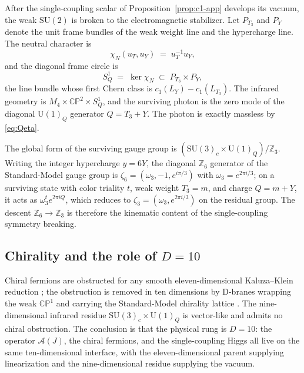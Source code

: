 \documentclass[aps,prd,onecolumn,superscriptaddress,nofootinbib,reprint]{revtex4-2}
\newcommand{\cA}{\mathcal{A}}
\newcommand{\SU}{\mathrm{SU}}
\newcommand{\U}{\mathrm{U}}
\newcommand{\CP}{\mathbb{CP}}
\newcommand{\Z}{\mathbb{Z}}
\begin{document}
After the single-coupling scalar of Proposition~\ref{prop:c1-app}
develops its vacuum, the weak $\SU(2)$ is broken to the
electromagnetic stabilizer.  Let $P_{T_{3}}$ and $P_{Y}$ denote the
unit frame bundles of the weak weight line and the hypercharge line.
The neutral character is
\begin{equation}
  \chi_{N}(u_{T},u_{Y})\;=\;u_{T}^{-1}u_{Y},
\end{equation}
and the diagonal frame circle is
\begin{equation}
  S^{1}_{Q}\;=\;\ker\chi_{N}\;\subset\;P_{T_{3}}\times P_{Y},
\end{equation}
the line bundle whose first Chern class is
$c_{1}(L_{Y})-c_{1}(L_{T_{3}})$.  The infrared geometry is
$M_{4}\times\CP^{2}\times S^{1}_{Q}$, and the surviving photon is the
zero mode of the diagonal $\U(1)_{Q}$ generator $Q=T_{3}+Y$.  The
photon is exactly massless by \eqref{eq:Qeta}.

The global form of the surviving gauge group is
$(\SU(3)_{c}\times\U(1)_{Q})/\Z_{3}$.  Writing the integer hypercharge
$y=6Y$, the diagonal $\Z_{6}$ generator of the Standard-Model gauge
group is
$\zeta_{6}=(\omega_{3},-1,e^{i\pi/3})$ with $\omega_{3}=e^{2\pi i/3}$;
on a surviving state with color triality $t$, weak weight $T_{3}=m$,
and charge $Q=m+Y$, it acts as
$\omega_{3}^{t}e^{2\pi i Q}$, which reduces to
$\zeta_{3}=(\omega_{3},e^{2\pi i/3})$ on the residual group.  The
descent $\Z_{6}\to\Z_{3}$ is therefore the kinematic content of the
single-coupling symmetry breaking.

\subsection{Chirality and the role of $D=10$}

Chiral fermions are obstructed for any smooth eleven-dimensional
Kaluza--Klein reduction \cite{Witten1981}; the obstruction is removed
in ten dimensions by D-branes wrapping the weak $\CP^{1}$ and
carrying the Standard-Model chirality lattice \cite{Witten1995}.  The
nine-dimensional infrared residue $\SU(3)_{c}\times\U(1)_{Q}$ is
vector-like and admits no chiral obstruction.  The conclusion is that
the physical rung is $D=10$: the operator $\cA(J)$, the chiral
fermions, and the single-coupling Higgs all live on the same ten-dimensional
interface, with the eleven-dimensional parent supplying linearization
and the nine-dimensional residue supplying the vacuum.

\end{document}

